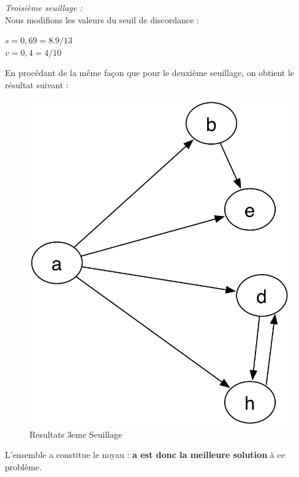 \documentclass[a4paper, 11pt]{article}
\begin{document}
\emph{Troisième seuillage :}\\
Nous modifions les valeurs du seuil de discordance :\\
\begin{center}
\textbf{$s = 0,69 = 8.9/13$\\
$v= 0,4 = 4/10$}
\end{center}
En procédant de la même façon que pour le deuxième seuillage, on obtient le résultat suivant :\\
\begin{figure}[H]
   \begin{center}
        \includegraphics[scale=0.25]{../CR/src/Amine/4eme.png}
        \caption{
           \label{fig} Resultats 3eme Seuillage 
        }
    \end{center}
\end{figure}
L’ensemble {a} constitue le noyau : \textbf{a est donc la meilleure solution} à ce problème.\\
\newpage
\end{document}
